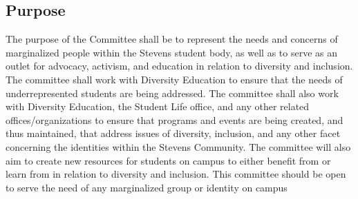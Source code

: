 \documentclass[12pt]{scrreprt}
\begin{document}
\subsection{Purpose}
The purpose of the Committee shall be to represent the needs and concerns of marginalized people within the Stevens student body, as well as to serve as an outlet for advocacy, activism, and education in relation to diversity and inclusion. The committee shall work with Diversity Education to ensure that the needs of underrepresented students are being addressed. The committee shall also work with Diversity Education, the Student Life office, and any other related offices/organizations to ensure that programs and events are being created, and thus maintained, that address issues of diversity, inclusion, and any other facet concerning the identities within the Stevens Community. The committee will also aim to create new resources for students on campus to either benefit from or learn from in relation to diversity and inclusion. This committee should be open to serve the need of any marginalized group or identity on campus
\end{document}
